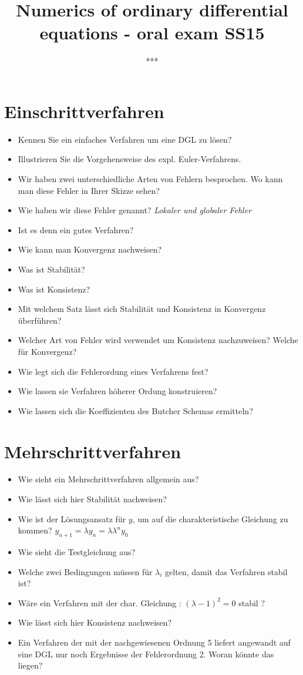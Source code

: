 \documentclass[12pt,a4paper]{article}
\author{***}
\title{Numerics of ordinary differential equations - oral exam SS15}
\begin{document}
\maketitle

\section{Einschrittverfahren}
\begin{itemize}
\item Kennen Sie ein einfaches Verfahren um eine DGL zu lösen?
\item Illustrieren Sie die Vorgehensweise des expl. Euler-Verfahrens.
\item Wir haben zwei unterschiedliche Arten von Fehlern besprochen. Wo kann man diese Fehler in Ihrer Skizze sehen?
\item Wie haben wir diese Fehler genannt? \textit{Lokaler und globaler Fehler}
\item Ist es denn ein gutes Verfahren?
\item Wie kann man Konvergenz nachweisen?
\item Was ist Stabilität?
\item Was ist Konsistenz?
\item Mit welchem Satz lässt sich Stabilität und Konsistenz in Konvergenz überführen?
\item Welcher Art von Fehler wird verwendet um Konsistenz nachzuweisen? Welche für Konvergenz?
\item Wie legt sich die Fehlerordung eines Verfahrens fest?
\item Wie lassen sie Verfahren höherer Ordung konstruieren?
\item Wie lassen sich die Koeffizienten des Butcher Schemas ermitteln?


\end{itemize}

\section{Mehrschrittverfahren}
\begin{itemize}
\item Wie sieht ein Mehrschrittverfahren allgemein aus?
\item Wie lässt sich hier Stabilität nachweisen?
\item Wie ist der Lösungsansatz für $y$, um auf die charakteristische Gleichung zu kommen? $y_{n+1} = \lambda y_n = \lambda \lambda^n y_0$
\item Wie sieht die Testgleichung aus?
\item Welche zwei Bedingungen müssen für $\lambda_i$ gelten, damit das Verfahren stabil ist?
\item Wäre ein Verfahren mit der char. Gleichung : $(\lambda -1)^2 = 0$ stabil ?
\item Wie lässt sich hier Konsistenz nachweisen?
\item Ein Verfahren der mit der nachgewiesenen Ordnung 5 liefert angewandt auf eine DGL nur noch Ergebnisse der Fehlerordnung 2. Woran könnte das liegen?



\end{itemize}
\end{document}
